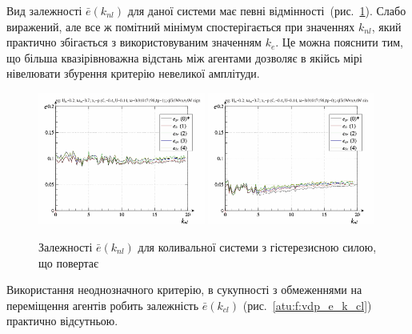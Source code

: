 Вид залежності
$ \bar{e} (k_{nl}) $ для даної системи має певні
відмінності~(рис.~\ref{atu:f:vg_e_k_nl}). Слабо виражений, але все ж
помітний мінімум спостерігається при значеннях
$k_{nl}$, який практично збігається з використовуваним значенням
$k_e$. Це можна пояснити тим, що більша квазірівноважна відстань
між агентами дозволяє в якійсь мірі нівелювати збурення
критерію невеликої амплітуди.

\begin{figure}[ht!]
\begin{center}
  \includegraphics[width=0.49\textwidth]{p/cha/vg/vg_id-p_k_nl_sign.png}
  \hfill
  \includegraphics[width=0.49\textwidth]{p/cha/vg/vg_id-p_k_nl_sin.png}
\end{center}
  \caption{Залежності $\bar{e}(k_{nl})$ для коливальної системи з гістерезисною силою, що повертає}
\label{atu:f:vg_e_k_nl}
\end{figure}

Використання неоднозначного критерію, в сукупності з
обмеженнями на переміщення агентів робить залежність
$ \bar{e} (k_{cl}) $ (рис.~\ref{atu:f:vdp_e_k_cl}) практично відсутньою.


